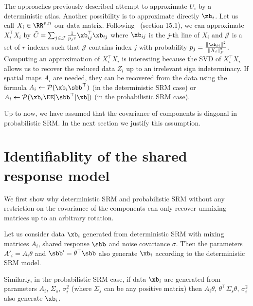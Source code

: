 The approaches previously described attempt to approximate $U_i$ by a
deterministic atlas. Another possibility is to approximate directly $\zb_i$.
Let us call $X_i \in \RR^{v,
  n}$ our data matrix. Following~\cite{mahoney2016lecture} (section 15.1), we
can approximate $X_i^{\top} X_i$ by $\tilde{C} = \sum_{j \in \mathcal{J}} \frac1{p_j r} \xb_{ij}^{\top} \xb_{ij}$ where $\xb_{ij}$ is the $j$-th line of
  $X_i$ and $\mathcal{J}$ is a set of $r$ indexes such that $\mathcal{J}$ contains
  index $j$ with probability $p_j = \frac{\|\xb_{ij}\|^2}{\|X_i
    \|^2_F}$. Computing an approximation of $X_i^{\top} X_i$ is interesting
  because the SVD of $X_i^{\top} X_i$ allows us to recover the reduced data
  $Z_i$ up to an irrelevant sign indeterminacy. 
  If spatial maps $A_i$ are needed, they can be recovered from the data using the formula
  $A_i \leftarrow \mathcal{P}(\xb_i \sbb^{\top})$ (in the deterministic SRM case) or
  $A_i \leftarrow \mathcal{P}(\xb_i \EE[\sbb^{\top}|\xb])$ (in the probabilistic SRM case).

  Up to now, we have assumed that the covariance of components is diagonal in
  probabilistic SRM. In the next section we justify this assumption.

\section{Identifiablity of the shared response model}
We first show why deterministic SRM and probabilistic SRM without any
restriction on the covariance of the components can
only recover unmixing matrices up to an arbitrary rotation.

Let us consider data $\xb_i$ generated from deterministic SRM with
mixing matrices $A_i$, shared response $\sbb$ and noise covariance $\sigma$.
Then the parameters $A'_i = A_i \theta$ and $\sbb' = \theta^{\top} \sbb$ also
generate $\xb_i$ according to the deterministic SRM model.

Similarly, in the probabilistic SRM case, if data $\xb_i$ are generated from
parameters $A_i$, $\Sigma_s$, $\sigma_i^2$ (where $\Sigma_s$ can be any positive
matrix) then $A_i\theta$, $\theta^{\top}
\Sigma_s \theta$, $\sigma_i^2$ also generate $\xb_i$.


